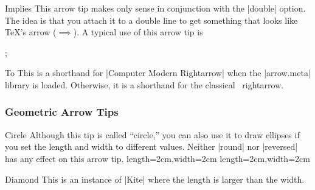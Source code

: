 \begin{arrowtipsimple}{Implies}
  This arrow tip makes only sense in conjunction with the |double|
  option. The idea is that you attach it to a double line to get
  something that looks like \TeX's \texttt{\string\implies} arrow
  ($\implies$). A typical use of this arrow tip is
\begin{codeexample}[]
\tikz {};
\end{codeexample}
  \begin{arrowexamples}
    \arrowexampledouble[]
    \arrowexampledouble[red]
  \end{arrowexamples}
\end{arrowtipsimple}

\begin{arrowtipsimple}{To}
  This is a shorthand for  |Computer Modern Rightarrow| when the
  |arrow.meta| library is loaded. Otherwise, it is a shorthand for the
  classical \tikzname\ rightarrow.
\end{arrowtipsimple}




\subsubsection{Geometric Arrow Tips}



\begin{arrowtip}{Circle}
  {
    Although this tip is called ``circle,'' you can also use it to
    draw ellipses if you set the length and width to different
    values. Neither |round| nor |reversed| has any effect on this
    arrow tip. 
  }
  {length=2cm,width=2cm}
  {length=2cm,width=2cm}
  
  \begin{arrowexamples}
    \arrowexample[]
    \arrowexampledup[sep]
    \arrowexampledupdot[sep]
    \arrowexample[open]
    \arrowexample[length=3pt]
    \arrowexample[slant=.3]
    \arrowexample[left]
    \arrowexample[right]
    \arrowexample[red]
  \end{arrowexamples}
\end{arrowtip}

\begin{arrowtipsimple}{Diamond}
  This is an instance of |Kite| where the length is larger than the
  width. 

  \begin{arrowexamples}
    \arrowexample[]
    \arrowexampledup[]
    \arrowexampledupdot[]
    \arrowexample[open]
    \arrowexample[length=10pt]
    \arrowexample[round]
    \arrowexample[slant=.3]
    \arrowexample[left]
    \arrowexample[right]
    \arrowexample[red]
    \arrowexample[fill=red!50]
  \end{arrowexamples}
\end{arrowtipsimple}

